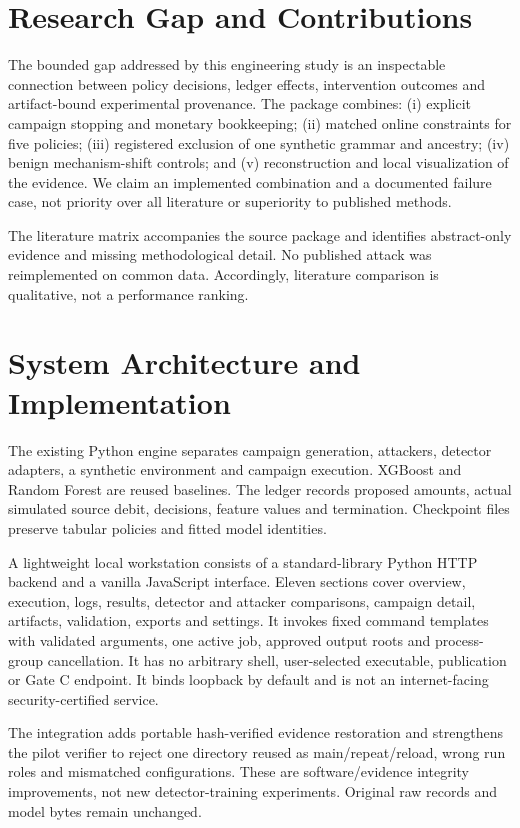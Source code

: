 \documentclass[conference]{IEEEtran}
\begin{document}
\section{Research Gap and Contributions}
The bounded gap addressed by this engineering study is an inspectable connection between policy decisions, ledger effects, intervention outcomes and artifact-bound experimental provenance. The package combines: (i) explicit campaign stopping and monetary bookkeeping; (ii) matched online constraints for five policies; (iii) registered exclusion of one synthetic grammar and ancestry; (iv) benign mechanism-shift controls; and (v) reconstruction and local visualization of the evidence. We claim an implemented combination and a documented failure case, not priority over all literature or superiority to published methods.

The literature matrix accompanies the source package and identifies abstract-only evidence and missing methodological detail. No published attack was reimplemented on common data. Accordingly, literature comparison is qualitative, not a performance ranking.

\section{System Architecture and Implementation}
The existing Python engine separates campaign generation, attackers, detector adapters, a synthetic environment and campaign execution. XGBoost \cite{xgboost} and Random Forest \cite{rf} are reused baselines. The ledger records proposed amounts, actual simulated source debit, decisions, feature values and termination. Checkpoint files preserve tabular policies and fitted model identities.

A lightweight local workstation consists of a standard-library Python HTTP backend and a vanilla JavaScript interface. Eleven sections cover overview, execution, logs, results, detector and attacker comparisons, campaign detail, artifacts, validation, exports and settings. It invokes fixed command templates with validated arguments, one active job, approved output roots and process-group cancellation. It has no arbitrary shell, user-selected executable, publication or Gate C endpoint. It binds loopback by default and is not an internet-facing security-certified service.

The integration adds portable hash-verified evidence restoration and strengthens the pilot verifier to reject one directory reused as main/repeat/reload, wrong run roles and mismatched configurations. These are software/evidence integrity improvements, not new detector-training experiments. Original raw records and model bytes remain unchanged.
\end{document}
